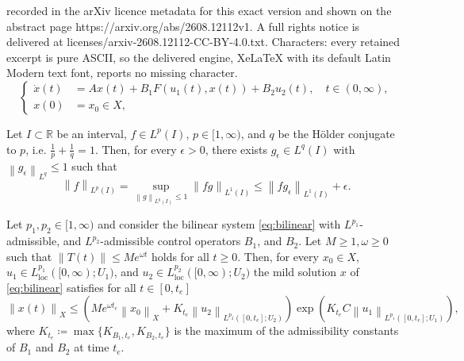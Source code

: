 \documentclass[10pt,a4paper]{amsart}
\newcommand{\RR}{\mathbb R}
\DeclareMathOperator{\loc}{loc}
\newcommand{\norm}[1]{\left\|#1\right\|}
\begin{document}
recorded in the arXiv licence metadata for this exact version and shown on the abstract page https://arxiv.org/abs/2608.12112v1. A full rights notice is delivered at licenses/arxiv-2608.12112-CC-BY-4.0.txt. Characters: every retained excerpt is pure ASCII, so the delivered engine, XeLaTeX with its default Latin Modern text font, reports no missing character.
\begin{equation}\label{eq:bilinear}
    \tag{$\Sigma$} \left\{
        \begin{aligned}
            \dot x(t) &= Ax(t) + B_1F(u_1(t),x(t)) + B_2u_2(t), \quad t\in (0, \infty),\\
            x(0) &= x_0 \in X,
        \end{aligned} \right.
    \end{equation}

\begin{lemma}\label{lem:equiv_Lp_norm}
    Let $I \subset \RR$ be an interval, $f \in L^p(I)$, $p \in [1,\infty)$, and $q$ be the H\"older conjugate to $p$, i.e. $\frac{1}{p} + \frac{1}{q}=1$. Then, for every $\epsilon>0$, there exists $g_\epsilon \in L^q(I)$ with $\norm{g_\epsilon}_{L^q} \leq 1$ such that
    \begin{equation*}
        \norm{f}_{L^p(I)} = \sup_{\norm{g}_{L^q(I)} \leq 1} \norm{fg}_{L^1(I)} \le \norm{fg_\epsilon}_{L^1(I)} + \epsilon. 
    \end{equation*}
\end{lemma}

\begin{lemma}\label{lem:x_bdd_by_data}
    Let $p_1,p_2 \in [1,\infty)$ and consider the bilinear system \eqref{eq:bilinear} with $L^{p_1}$-admissible, and $L^{p_2}$-admissible control operators $B_1$, and $ B_2$. Let $M \ge 1,\omega \geq 0$ such that $\norm{T(t)} \leq Me^{\omega t}$ holds for all $t \geq 0$. Then, for every $x_0 \in X$, $u_1 \in L^{p_1}_{\loc}([0,\infty); U_1)$, and $u_2 \in L^{p_2}_{\loc}([0,\infty); U_2)$ the mild solution $x$ of \eqref{eq:bilinear} satisfies for all $t \in [0, t_e]$
\begin{equation}\label{est:x_bdd_by_data}
    \norm{x(t)}_X \leq \left(Me^{\omega t_e}\norm{x_0}_X + K_{t_e} \norm{u_2}_{L^{p_2}([0,t_e]; U_2)}\right)\exp\left(K_{t_e}C \norm{u_1}_{L^{p_1}([0,t_e];U_1)}\right),
\end{equation}
where $K_{t_e} \coloneqq \max\{K_{B_1, t_e}, K_{B_2, t_e}\}$ is the maximum of the admissibility constants of $B_1$ and $B_2$ at time $t_e$. 
\end{lemma}
\end{document}
